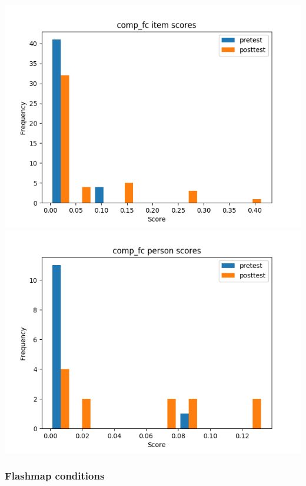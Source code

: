 \documentclass[]{article}
\begin{document}
\includegraphics{comp_fc_diff.png} \includegraphics{comp_fc_abil.png}

\subsubsection{Flashmap conditions}\label{flashmap-conditions-4}
\end{document}
